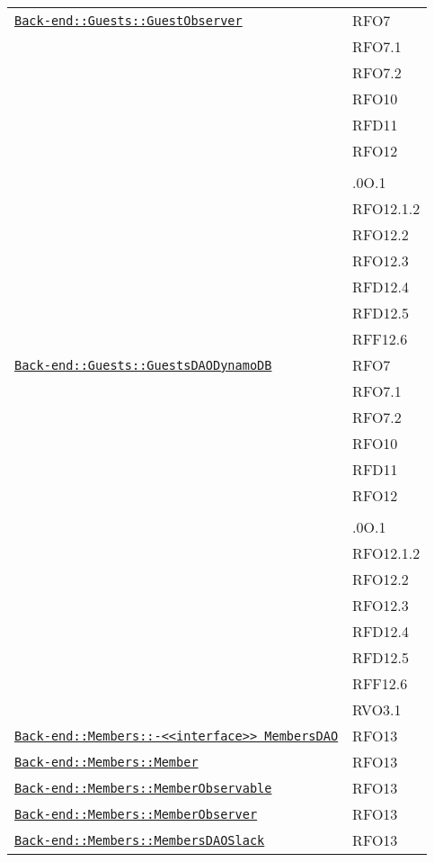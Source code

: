 \begin{longtable}{|>{\centering}m{10cm}|m{3cm}<{\centering}|}
\hyperref[Back-end::Guests::GuestObserver]{\texttt{Back-end::Guests::GuestObserver}} & RFO7\\
& RFO7.1\\
& RFO7.2\\
& RFO10\\
& RFD11\\
& RFO12\\
& \\
& .0O.1\\
& RFO12.1.2\\
& RFO12.2\\
& RFO12.3\\
& RFD12.4\\
& RFD12.5\\
& RFF12.6\\ \hline

\hyperref[Back-end::Guests::GuestsDAODynamoDB]{\texttt{Back-end::Guests::GuestsDAODynamoDB}} & RFO7\\
& RFO7.1\\
& RFO7.2\\
& RFO10\\
& RFD11\\
& RFO12\\
& \\
& .0O.1\\
& RFO12.1.2\\
& RFO12.2\\
& RFO12.3\\
& RFD12.4\\
& RFD12.5\\
& RFF12.6\\
& RVO3.1\\ \hline

\hyperref[Back-end::Members::<<interface>> MembersDAO]{\texttt{Back-end::Members::-\linebreak <<interface>> MembersDAO}} & RFO13\\ \hline

\hyperref[Back-end::Members::Member]{\texttt{Back-end::Members::Member}} & RFO13\\ \hline

\hyperref[Back-end::Members::MemberObservable]{\texttt{Back-end::Members::MemberObservable}} & RFO13\\ \hline

\hyperref[Back-end::Members::MemberObserver]{\texttt{Back-end::Members::MemberObserver}} & RFO13\\ \hline

\hyperref[Back-end::Members::MembersDAOSlack]{\texttt{Back-end::Members::MembersDAOSlack}} & RFO13\\ \hline


\end{longtable}
